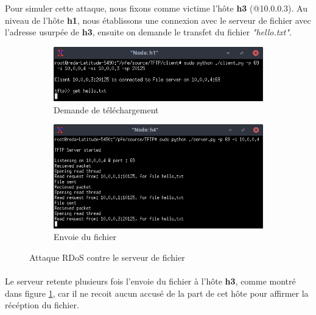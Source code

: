 Pour simuler cette attaque, nous fixons comme victime l'hôte \textbf{h3} (@10.0.0.3). Au niveau de l'hôte \textbf{h1}, nous établissons une connexion avec le serveur de fichier avec l'adresse usurpée de \textbf{h3}, ensuite on demande le transfet du fichier \textit{"hello.txt"}.
\begin{figure}[h]
\centering
\begin{subfigure}{12.5cm}
\centering
\includegraphics[width=\textwidth]{Figures/simulation/mininet/TFTP/client/attack}
\caption{Demande de téléchargement}
\end{subfigure}
\vskip 0.4cm
\begin{subfigure}{12.5cm}
\centering
\includegraphics[width=\textwidth]{Figures/simulation/mininet/TFTP/server/attack_request}
\caption{Envoie du fichier}
\label{fig:send}
\end{subfigure}
\vskip 0.3cm
\decoRule
\caption{Attaque RDoS contre le serveur de fichier}
\label{fig:c/s_TFTP}
\end{figure}
\paragraph{}
Le serveur retente plusieurs fois l'envoie du fichier à l'hôte \textbf{h3}, comme montré dans figure \ref{fig:send}, car il ne recoit aucun accusé de la part de cet hôte pour affirmer la récéption du fichier.\\

